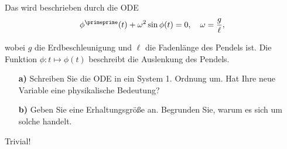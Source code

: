 \begin{exercise}

Das  wird beschrieben durch die ODE
\begin{align*}
  \phi^\primeprime(t) + \omega^2 \sin{\phi(t)} = 0,
  \quad
  \omega = \frac{g}{\ell},
\end{align*}

wobei $g$ die Erdbeschleunigung und $\ell$ die Fadenlänge des Pendels ist. Die Funktion $\phi: t \mapsto \phi(t)$ beschreibt die Auslenkung des Pendels.

\begin{itemize}

  \item[\textbf{a)}] Schreiben Sie die ODE in ein System 1. Ordnung um. Hat Ihre neue Variable eine physikalische
  Bedeutung?

  \item[\textbf{b)}] Geben Sie eine Erhaltungsgröße an. Begrunden Sie, warum es sich um solche handelt.

\end{itemize}

\end{exercise}

\begin{solution}

Trivial!

\end{solution}
